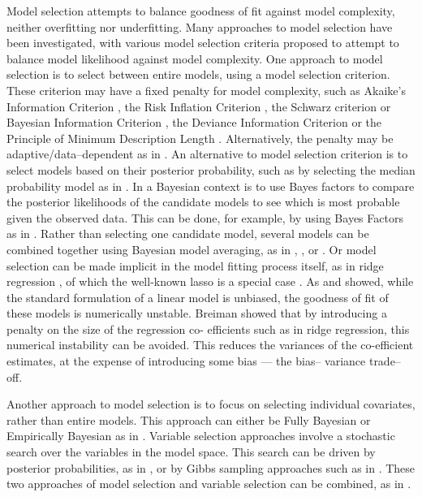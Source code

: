\documentclass{amsart}[12pt]
\begin{document}

Model selection attempts to balance goodness of fit against model complexity, neither overfitting nor
underfitting. Many approaches to model selection have been investigated, with various model selection criteria
proposed to attempt to balance model likelihood against model complexity. One approach to model selection is
to select between entire models, using a model selection criterion. These criterion may have a fixed penalty
for model complexity, such as Akaike's Information Criterion \citep{Akaike1974}, the Risk Inflation Criterion
\citep{Foster1994}, the Schwarz criterion or Bayesian Information Criterion \citep{Schwarz1978}, the Deviance
Information Criterion \citep{Spiegelhalter2016} or the Principle of Minimum Description Length
\citep{Hansen2001}. Alternatively, the penalty may be adaptive/data--dependent as in \citep{George2000}. An
alternative to model selection criterion is to select models based on their posterior probability, such as by
selecting the median probability model as in \citep{Barbieri2004}. In a Bayesian context is to use Bayes
factors to compare the posterior likelihoods of the candidate models to see which is most probable given the
observed data. This can be done, for example, by using Bayes Factors as in \citep{Kass1993}. Rather than
selecting one candidate model, several models can be combined together using Bayesian model  averaging, as in
\citep{Hoeting1999}, \citep{Raftery1997}, \citep{Fernandez2001} or \citep{Papaspiliopoulos2016}. Or model
selection can be made implicit in the model fitting process itself, as in ridge regression \citep{Casella1980},
of which the well-known lasso is a special case \citep{Tibshirani1996}. As \citep{Breiman1996} and
\citep{Efron2013} showed, while  the standard formulation of a linear model is unbiased, the goodness of fit of
these models is numerically  unstable. Breiman showed that by introducing a penalty on the size of the
regression co- efficients such as  in ridge regression, this numerical instability can be avoided. This
reduces the variances of the co-efficient estimates, at the expense of introducing some bias --- the bias--
variance trade--off.

Another approach to model selection is to focus on selecting individual covariates, rather than entire
models. This approach can either be Fully Bayesian or Empirically Bayesian as in \citep{Cui2008}. Variable
selection approaches involve a stochastic search over the variables in the model space. This search can be
driven by posterior probabilities, as in \citep{Casella2006}, or by Gibbs sampling approaches such as in
\citep{George1993}. These two approaches of model selection and variable selection can be combined, as in
\citep{Geweke1996}.
\end{document}

